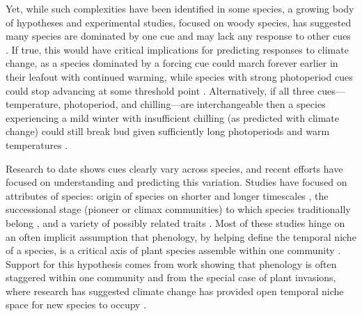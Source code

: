 \documentclass[11pt]{article}
\begin{document}
Yet, while such complexities have been identified in some species, a growing body of hypotheses and experimental studies, focused on woody species, has suggested many species are dominated by one cue and may lack any response to other cues \citep{Korner:2010}. If true, this would have critical implications for predicting responses to climate change, as a species dominated by a forcing cue could march forever earlier in their leafout with continued warming, while species with strong photoperiod cues could stop advancing at some threshold point \citep{Korner:2010}. Alternatively, if all three cues---temperature, photoperiod, and chilling---are interchangeable then a species experiencing a mild winter with insufficient chilling (as predicted with climate change) could still break bud given sufficiently long photoperiods and warm temperatures \citep{Heide:1993b}. 

Research to date shows cues clearly vary across species, and recent efforts have focused on understanding and predicting this variation. Studies have focused on attributes of species: origin of species on shorter and longer timescales \citep{Willis:2010al,zohner2017}, the successional stage (pioneer or climax communities) to which species traditionally belong \citep{laube2014gcb,Basler:2012aa}, and a variety of possibly related traits \citep{Lechowicz:1984aa,Polgar:2014aa}. Most of these studies hinge on an often implicit assumption that phenology, by helping define the temporal niche of a species, is a critical axis of plant species assemble within one community \citep{gotelli1996}. Support for this hypothesis comes from work showing that phenology is often staggered within one community and from the special case of plant invasions, where research has suggested climate change has provided open temporal niche space for new species to occupy \citep{Willis:2010al,wolkovichAmBot2013}.  
\end{document}
